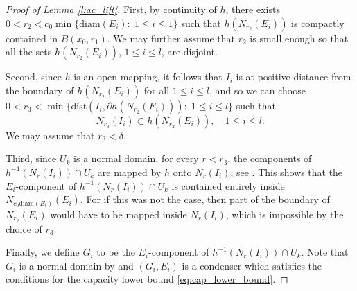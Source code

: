 \documentclass[10pt,letterpaper]{amsart}
\theoremstyle{definition}
\numberwithin{thm}{subsection}
\numberwithin{equation}{section}
\begin{document}
\begin{proof}[Proof of Lemma \ref{l:ac_lift}]
First, by continuity of $h$, there exists $0<r_2<c_0 \min \{\mathrm{diam}(E_i):\;1\leq i\leq 1\}$ such that $h(N_{r_2}(E_i))$ is compactly contained in $B(x_0,r_1)$. We may further assume that $r_2$ is small enough so that all the sets $h(N_{r_2}(E_i))$, $1\leq i\leq l$, are disjoint.

Second, since $h$ is an open mapping, it follows that $I_i$ is at positive distance from the boundary of $h(N_{r_2}(E_i))$ for all $1\leq i\leq l$, and so we can choose $0<r_3<\min\{\mathrm{dist}(I_i,\partial h(N_{r_2}(E_i))):\; 1\leq i\leq l\}$ such that
\begin{displaymath}
N_{r_3}(I_i)\subset h(N_{r_2}(E_i)),\quad 1\leq i\leq l.
\end{displaymath}
We may assume that $r_3<\delta$.

Third, since $U_k$ is a normal domain, for every $r<r_3$, the components of $h^{-1}(N_r(I_i))\cap U_k$ are mapped by $h$ onto $N_r(I_i)$; see \cite[I, Lemma 4.8]{MR2210111}. This shows that the $E_i$-component of $h^{-1}(N_r(I_i))\cap U_k$ is contained entirely inside $N_{c_0 \mathrm{diam}(E_i)}(E_i)$. For if this was not the case, then part of the boundary of $N_{r_2}(E_i)$ would have to be mapped inside $N_r(I_i)$, which is impossible by the choice of $r_3$.

Finally, we define $G_i$ to be the $E_i$-component of $h^{-1}(N_{r}(I_i))\cap U_k$. Note that $G_i$ is a normal domain by \cite[I, Lemma 4.7]{MR2210111} and $(G_i,E_i)$ is a condenser which satisfies the conditions for the capacity lower bound \eqref{eq:cap_lower_bound}.


\end{proof}
\end{document}
